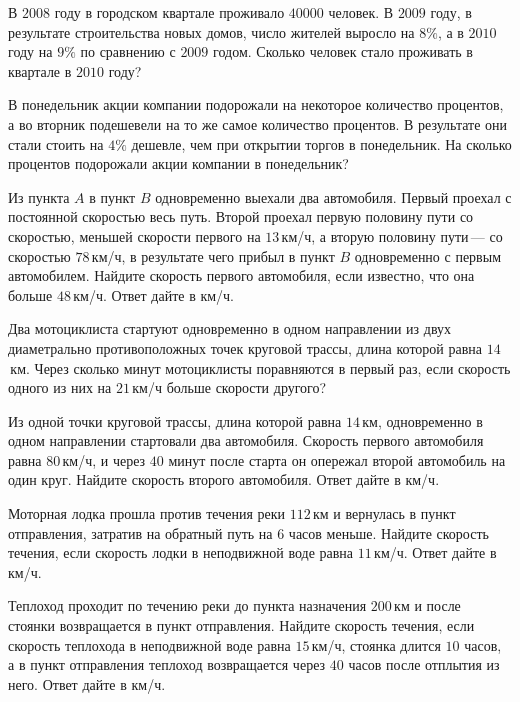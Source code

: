 \begin{class}[number=5]
	\begin{listofex}
		\item В \(2008\) году в городском квартале проживало \(40 000\) человек. В \(2009 \) году, в результате строительства новых домов, число жителей выросло на \(8 \%\), а в \(2010\) году на \(9 \%\) по сравнению с \(2009\) годом. Сколько человек стало проживать в квартале в \(2010\) году?
		\item В понедельник акции компании подорожали на некоторое количество процентов, а во вторник подешевели на то же самое количество процентов. В результате они стали стоить на \(4 \%\) дешевле, чем при открытии торгов в понедельник. На сколько процентов подорожали акции компании в понедельник?
		
		
		\item Из пункта \(A\) в пункт \(B\) одновременно выехали два автомобиля. Первый проехал с постоянной скоростью весь путь. Второй проехал первую половину пути со скоростью, меньшей скорости первого на \(13\) км/ч, а вторую половину пути --- со скоростью \(78\) км/ч, в результате чего прибыл в пункт \(B\) одновременно с первым автомобилем. Найдите скорость первого автомобиля, если известно, что она больше \(48\) км/ч. Ответ дайте в км/ч.
		
		\item Два мотоциклиста стартуют одновременно в одном направлении из двух диаметрально противоположных точек круговой трассы, длина которой равна \(14\) км. Через сколько минут мотоциклисты поравняются в первый раз, если скорость одного из них на \(21\) км/ч больше скорости другого?
		\item Из одной точки круговой трассы, длина которой равна \(14\) км, одновременно в одном направлении стартовали два автомобиля. Скорость первого автомобиля равна \(80\) км/ч, и через \(40\) минут после старта он опережал второй автомобиль на один круг. Найдите скорость второго автомобиля. Ответ дайте в км/ч.
		
		\item Моторная лодка прошла против течения реки \(112\) км и вернулась в пункт отправления, затратив на обратный путь на \(6\) часов меньше. Найдите скорость течения, если скорость лодки в неподвижной воде равна \(11\) км/ч. Ответ дайте в км/ч.
		\item Теплоход проходит по течению реки до пункта назначения \(200\) км и после стоянки возвращается в пункт отправления. Найдите скорость течения, если скорость теплохода в неподвижной воде равна \(15\) км/ч, стоянка длится \(10\) часов, а в пункт отправления теплоход возвращается через \(40\) часов после отплытия из него. Ответ дайте в км/ч.
		

\end{listofex}
\end{class}
